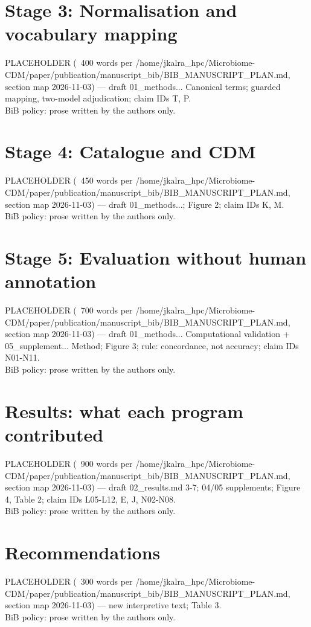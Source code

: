 \documentclass[11pt,a4paper]{article}
\begin{document}
\section{Stage 3: Normalisation and vocabulary mapping}
PLACEHOLDER (~400 words per /home/jkalra\_hpc/Microbiome-CDM/paper/publication/manuscript\_bib/BIB\_MANUSCRIPT\_PLAN.md, section map 2026-11-03) --- draft 01\_methods... Canonical terms; guarded mapping, two-model adjudication; claim IDs T, P.\\
BiB policy: prose written by the authors only.

\section{Stage 4: Catalogue and CDM}
PLACEHOLDER (~450 words per /home/jkalra\_hpc/Microbiome-CDM/paper/publication/manuscript\_bib/BIB\_MANUSCRIPT\_PLAN.md, section map 2026-11-03) --- draft 01\_methods...; Figure 2; claim IDs K, M.\\
BiB policy: prose written by the authors only.

\section{Stage 5: Evaluation without human annotation}
PLACEHOLDER (~700 words per /home/jkalra\_hpc/Microbiome-CDM/paper/publication/manuscript\_bib/BIB\_MANUSCRIPT\_PLAN.md, section map 2026-11-03) --- draft 01\_methods... Computational validation + 05\_supplement... Method; Figure 3; rule: concordance, not accuracy; claim IDs N01-N11.\\
BiB policy: prose written by the authors only.

\section{Results: what each program contributed}
PLACEHOLDER (~900 words per /home/jkalra\_hpc/Microbiome-CDM/paper/publication/manuscript\_bib/BIB\_MANUSCRIPT\_PLAN.md, section map 2026-11-03) --- draft 02\_results.md 3-7; 04/05 supplements; Figure 4, Table 2; claim IDs L05-L12, E, J, N02-N08.\\
BiB policy: prose written by the authors only.

\section{Recommendations}
PLACEHOLDER (~300 words per /home/jkalra\_hpc/Microbiome-CDM/paper/publication/manuscript\_bib/BIB\_MANUSCRIPT\_PLAN.md, section map 2026-11-03) --- new interpretive text; Table 3.\\
BiB policy: prose written by the authors only.
\end{document}
